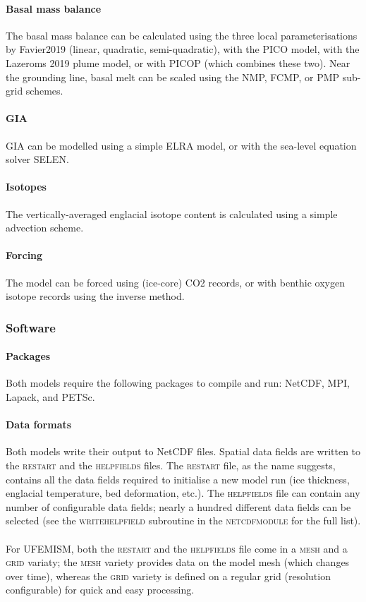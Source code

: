 \documentclass{article}
\begin{document}
\paragraph{Basal mass balance}
The basal mass balance can be calculated using the three local parameterisations by Favier2019 (linear, quadratic, semi-quadratic), with the PICO model, with the Lazeroms 2019 plume model, or with PICOP (which combines these two). Near the grounding line, basal melt can be scaled using the NMP, FCMP, or PMP sub-grid schemes.

\paragraph{GIA}
GIA can be modelled using a simple ELRA model, or with the sea-level equation solver SELEN.

\paragraph{Isotopes}
The vertically-averaged englacial isotope content is calculated using a simple advection scheme.

\paragraph{Forcing}
The model can be forced using (ice-core) CO2 records, or with benthic oxygen isotope records using the inverse method.

\newpage
\subsubsection{Software}

\paragraph{Packages}
Both models require the following packages to compile and run: NetCDF, MPI, Lapack, and PETSc.

\paragraph{Data formats}
Both models write their output to NetCDF files. Spatial data fields are written to the \textsc{restart} and the \textsc{help\textunderscore fields} files. The \textsc{restart} file, as the name suggests, contains all the data fields required to initialise a new model run (ice thickness, englacial temperature, bed deformation, etc.). The \textsc{help\textunderscore fields} file can contain any number of configurable data fields; nearly a hundred different data fields can be selected (see the \textsc{write\textunderscore help\textunderscore field} subroutine in the \textsc{netcdf\textunderscore module} for the full list).\\
\\
For UFEMISM, both the \textsc{restart} and the \textsc{help\textunderscore fields} file come in a \textsc{mesh} and a \textsc{grid} variaty; the \textsc{mesh} variety provides data on the model mesh (which changes over time), whereas the \textsc{grid} variety is defined on a regular grid (resolution configurable) for quick and easy processing.
\end{document}
